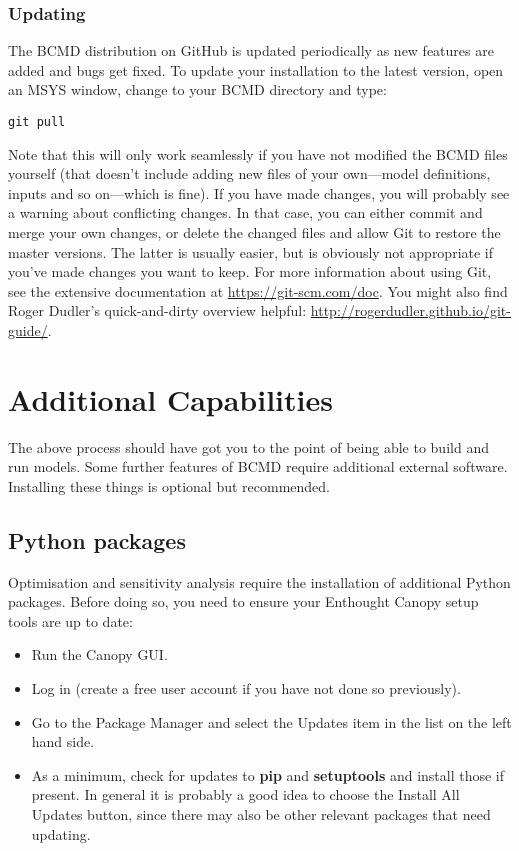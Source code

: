 \documentclass[a4paper,11pt]{article}
\begin{document}
\subsubsection{Updating}

The BCMD distribution on GitHub is updated periodically as new features are added and bugs get fixed. To update your installation to the latest version, open an MSYS window, change to your BCMD directory and type:
\begin{verbatim}
git pull
\end{verbatim}
Note that this will only work seamlessly if you have not modified the BCMD files yourself (that doesn't include adding new files of your own---model definitions, inputs and so on---which is fine). If you have made changes, you will probably see a warning about conflicting changes. In that case, you can either commit and merge your own changes, or delete the changed files and allow Git to restore the master versions. The latter is usually easier, but is obviously not appropriate if you've made changes you want to keep. For more information about using Git, see the extensive documentation at \url{https://git-scm.com/doc}. You might also find Roger Dudler's quick-and-dirty overview helpful: \url{http://rogerdudler.github.io/git-guide/}.

\section{Additional Capabilities}

The above process should have got you to the point of being able to build and run models. Some further features of BCMD require additional external software. Installing these things is optional but recommended.

\subsection{Python packages}

Optimisation and sensitivity analysis require the installation of additional Python packages. Before doing so, you need to ensure your Enthought Canopy setup tools are up to date:

\begin{itemize}
\item Run the Canopy GUI.
\item Log in (create a free user account if you have not done so previously).
\item Go to the Package Manager and select the Updates item in the list on the left hand side.
\item As a minimum, check for updates to \textbf{pip} and \textbf{setuptools} and install those if present. In general it is probably a good idea to choose the Install All Updates button, since there may also be other relevant packages that need updating.
\end{itemize}
\end{document}
